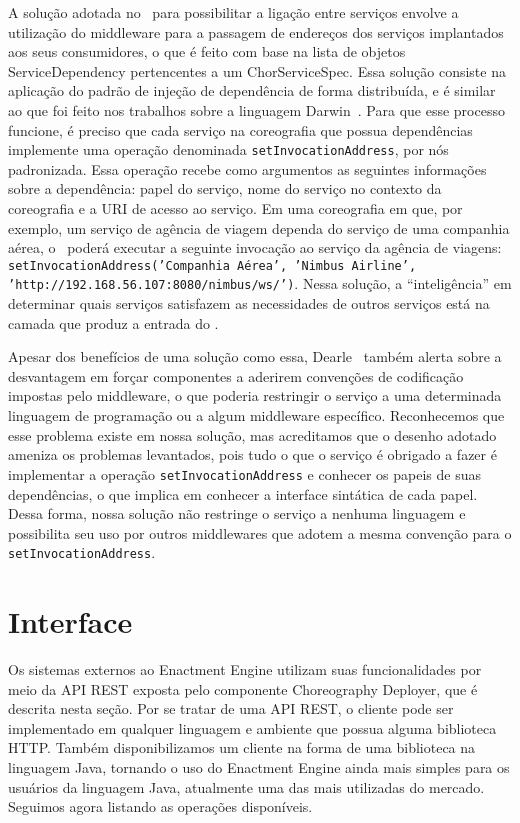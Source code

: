 A solução adotada no \ee\ para possibilitar a ligação entre serviços envolve a utilização do middleware para a passagem de endereços dos serviços implantados aos seus consumidores, o que é feito com base na lista de objetos \textsf{ServiceDependency} pertencentes a um \textsf{ChorServiceSpec}. Essa solução consiste na aplicação do padrão de injeção de dependência de forma distribuída, e é similar ao que foi feito nos trabalhos sobre a linguagem Darwin~\cite{Magee1996Dynamic, Magee1994Regis}. Para que esse processo funcione, é preciso que cada serviço na coreografia que possua dependências implemente uma operação denominada \texttt{setInvocationAddress}, por nós padronizada. Essa operação recebe como argumentos as seguintes informações sobre a dependência: papel do serviço, nome do serviço no contexto da coreografia e a URI de acesso ao serviço.  Em uma coreografia em que, por exemplo, um serviço de agência de viagem dependa do serviço de uma companhia aérea, o \ee\ poderá executar a seguinte invocação ao serviço da agência de viagens: \texttt{setInvocationAddress('Companhia Aérea', 'Nimbus Airline', 'http://192.168.56.107:8080/nimbus/ws/')}. Nessa solução, a ``inteligência'' em determinar quais serviços satisfazem as necessidades de outros serviços está na camada que produz a entrada do \ee.

Apesar dos benefícios de uma solução como essa, Dearle~\cite{Dearle2007PastPresentFuture} também alerta sobre a desvantagem em forçar componentes a aderirem convenções de codificação impostas pelo middleware, o que poderia restringir o serviço a uma determinada linguagem de programação ou a algum middleware específico. Reconhecemos que esse problema existe em nossa solução, mas acreditamos que o desenho adotado ameniza os problemas levantados, pois tudo o que o serviço é obrigado a fazer é implementar a operação \texttt{setInvocationAddress} e conhecer os papeis de suas dependências, o que implica em conhecer a interface sintática de cada papel. Dessa forma, nossa solução não restringe o serviço a nenhuma linguagem e possibilita seu uso por outros middlewares que adotem a mesma convenção para o \texttt{setInvocationAddress}.

\section{Interface}
\label{sec:interface}

Os sistemas externos ao Enactment Engine utilizam suas funcionalidades por meio da API REST exposta pelo componente Choreography Deployer, que é descrita nesta seção. Por se tratar de uma API REST, o cliente pode ser implementado em qualquer linguagem e ambiente que possua alguma biblioteca HTTP. Também disponibilizamos um cliente na forma de uma biblioteca na linguagem Java, tornando o uso do Enactment Engine ainda mais simples para os usuários da linguagem Java, atualmente uma das mais utilizadas do mercado. Seguimos agora listando as operações disponíveis. 

